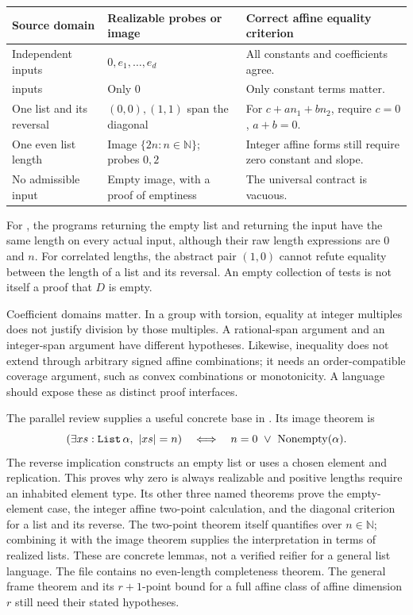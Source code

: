 \documentclass[11pt,letterpaper]{article}
\newcommand{\code}[1]{\texttt{\detokenize{#1}}}
\newcommand{\N}{\mathbb N}\newcommand{\Z}{\mathbb Z}
\theoremstyle{definition}\newtheorem{definition}[proposition]{Definition}
\theoremstyle{remark}\newtheorem{remark}[proposition]{Remark}
\begin{document}
\begin{center}\small
\begin{tabularx}{\textwidth}{@{}P{0.24\textwidth}P{0.25\textwidth}Y@{}}
\toprule Source domain & Realizable probes or image & Correct affine equality criterion\\\midrule
Independent \code{List Nat} inputs & $0,e_1,\ldots,e_d$ & All constants and coefficients agree.\\
\code{List Empty} inputs & Only $0$ & Only constant terms matter.\\
One list and its reversal & $(0,0),(1,1)$ span the diagonal & For $c+a n_1+b n_2$, require $c=0$, $a+b=0$.\\
One even list length & Image $\{2n:n\in\N\}$; probes $0,2$ & Integer affine forms still require zero constant and slope.\\
No admissible input & Empty image, with a proof of emptiness & The universal contract is vacuous.\\
\bottomrule
\end{tabularx}
\end{center}
For \code{List Empty}, the programs returning the empty list and returning
the input have the same length on every actual input, although their raw
length expressions are $0$ and $n$. For correlated lengths, the abstract
pair $(1,0)$ cannot refute equality between the length of a list and its
reversal. An empty collection of tests is not itself a proof that $D$ is empty.

Coefficient domains matter. In a group with torsion, equality at integer
multiples does not justify division by those multiples. A rational-span
argument and an integer-span argument have different hypotheses. Likewise,
inequality does not extend through arbitrary signed affine combinations;
it needs an order-compatible coverage argument, such as convex combinations
or monotonicity. A language should expose these as distinct proof interfaces.

The parallel review supplies a useful concrete base in \code{ListImage.lean}
\cite{parallel-r4}. Its image theorem is
\[
 (\exists xs:\code{List}\,\alpha,\ |xs|=n)
 \quad\Longleftrightarrow\quad n=0\ \lor\ \operatorname{Nonempty}(\alpha).
\]
The reverse implication constructs an empty list or uses a chosen element
and replication. This proves why zero is always realizable and positive
lengths require an inhabited element type. Its other three named theorems
prove the empty-element case, the integer affine two-point calculation, and
the diagonal criterion for a list and its reverse. The two-point theorem
itself quantifies over $n\in\N$; combining it with the image theorem supplies
the interpretation in terms of realized lists. These are concrete lemmas,
not a verified reifier for a general list language. The file contains no
even-length completeness theorem. The general frame theorem and its
$r+1$-point bound for a full affine class of affine dimension $r$ still need
their stated hypotheses.
\end{document}
